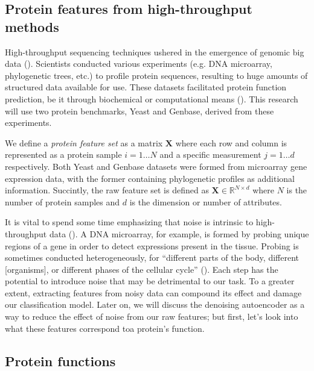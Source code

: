 \subsection{Protein features from high-throughput methods}

\par High-throughput sequencing techniques ushered in the emergence of
genomic big data (\cite{reuter2015high}). Scientists conducted various
experiments (e.g. DNA microarray, phylogenetic trees, etc.) to profile
protein sequences, resulting to huge amounts of structured data available for
use. These datasets facilitated protein function prediction, be it through
biochemical or computational means (\cite{eisenberg2000protein,
marcotte1999combined}). This research will use two protein benchmarks,
Yeast and Genbase, derived from these experiments.

\par We define a \textit{protein feature set} as a matrix $\mathbf{X}$ where
each row and column is represented as a protein sample $i=1\dots N$ and a
specific measurement $j=1\dots d$ respectively. Both Yeast and Genbase
datasets were formed from microarray gene expression data, with the former
containing phylogenetic profiles as additional information. Succintly, the
raw feature set is defined as $\mathbf{X} \in \mathbb{R}^{N \times d}$ where $N$
is the number of protein samples and $d$ is the dimension or number of
attributes.

\par It is vital to spend some time emphasizing that noise is intrinsic to
high-throughput data (\cite{hong2013estimating}). A DNA microarray, for
example, is formed by probing unique regions of a gene in order to detect
expressions present in the tissue. Probing is sometimes conducted
heterogeneously, for ``different parts of the body, different [organisms], or
different phases of the cellular cycle'' (\cite{nguyen2009noise}). Each step
has the potential to introduce noise that may be detrimental to our task. To
a greater extent, extracting features from noisy data can compound its effect
and damage our classification model. Later on, we will discuss the denoising
autoencoder as a way to reduce the effect of noise from our raw features; but
first, let's look into what these features correspond to\textemdash a
protein's function.

\subsection{Protein functions}


